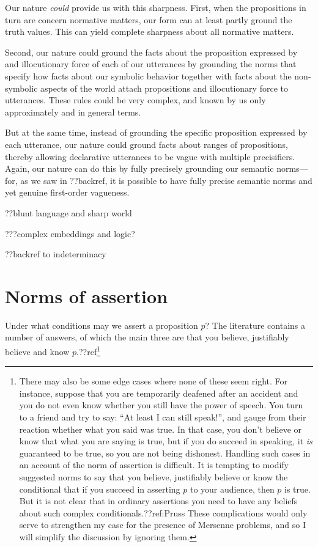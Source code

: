 Our nature \textit{could} provide us with this sharpness. First, when the propositions in turn are concern normative matters, our 
form can at least partly ground the truth values. This can yield complete sharpness about all normative matters.

Second, our nature could ground the facts about the proposition expressed by and illocutionary force of each of our utterances 
by grounding the norms that specify how facts about our symbolic behavior together with facts about the non-symbolic aspects of the world attach 
propositions and illocutionary force to utterances. These rules could be very complex, and known by us only approximately and in general
terms. 

But at the same time, instead of grounding the specific proposition expressed by each utterance, our nature could ground facts 
about ranges of propositions, thereby allowing declarative utterances to be vague with multiple precisifiers. Again, our nature 
can do this by fully precisely grounding our semantic norms---for, as we saw in ??backref, it is possible to have fully precise
semantic norms and yet genuine first-order vagueness.

??blunt language and sharp world

???complex embeddings and logic?


??backref to indeterminacy

\section{Norms of assertion}
Under what conditions may we assert a proposition $p$? The literature contains a number of answers, of which the main 
three are that you believe, justifiably believe and know $p$.??ref\footnote{There may also be some edge cases where none 
of these seem right. For instance, suppose that you are temporarily deafened after an accident and you do not even know whether 
you still have the power of speech. You turn to a friend and try to say: ``At least I can still speak!'', and gauge from 
their reaction whether what you said was true. In that case, you don't believe or know that what you are saying is true, but 
if you do succeed in speaking, it \textit{is} guaranteed to be true, so you are not being dishonest. Handling such cases in 
an account of the norm of assertion is difficult. It is tempting to modify suggested norms to say that you believe, 
justifiably believe or know the conditional that if you succeed in asserting $p$ to your audience, then $p$ is true. But it is 
not clear that in ordinary assertions you need to have any beliefs about such complex conditionals.??ref:Pruss These complications
would only serve to strengthen my case for the presence of Mersenne problems, and so I will simplify the discussion by ignoring them.}

